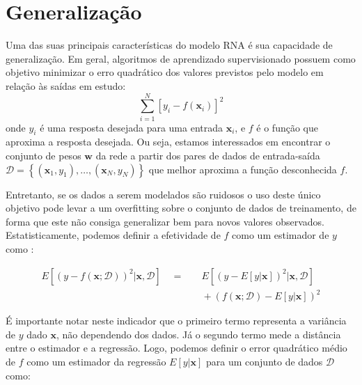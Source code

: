 \documentclass[conference]{IEEEtran}
\begin{document}
	\section{Generalização}
	 Uma das suas principais características do modelo RNA é sua capacidade de generalização.  Em geral, algoritmos de aprendizado supervisionado possuem como objetivo minimizar o erro quadrático dos valores previstos pelo modelo em relação às saídas em estudo:
	 \begin{equation}
	 	\sum_{i=1}^{N} [y_i - f(\mathbf{x}_i)]^2
	 	\label{eq:sqrd}
	 \end{equation}
	 onde $y_i$ é uma resposta desejada para uma entrada $\mathbf{x}_i$, e $f$ é o função que aproxima a resposta desejada. Ou seja, estamos interessados em encontrar o conjunto de pesos $\mathbf{w}$ da rede a partir dos pares de dados de entrada-saída $\mathcal{D} = \left\lbrace (\mathbf{x}_1, y_1), \dots, (\mathbf{x}_N, y_N)\right\rbrace $ que melhor aproxima a função desconhecida $f$.
	 
	 Entretanto, se os dados a serem modelados são ruidosos o uso deste único objetivo pode levar a um overfitting sobre o conjunto de dados de treinamento, de forma que este não consiga generalizar bem para novos valores observados. Estatisticamente, podemos definir a efetividade de $f$ como um estimador de $y$ como \cite{geman1992neural}:
	 
	 \begin{equation}
	 	\begin{aligned}
	 		E[(y - f(\mathbf{x}; \mathcal{D}))^2 | \mathbf{x}, \mathcal{D}] \quad = & \quad E\left[ (y - E \left[ y | \mathbf{x}\right] )^2 | \mathbf{x}, \mathcal{D}\right]   \\
	 		& \quad + (f(\mathbf{x};\mathcal{D}) - E[y|\mathbf{x}])^2
	 	\end{aligned}
	 \end{equation}
	 
	 É importante notar neste indicador que o primeiro termo representa a variância de $y$ dado $\mathbf{x}$, não dependendo dos dados. Já o segundo termo mede a distância entre o estimador e a regressão. Logo, podemos definir o error quadrático médio de $f$ como um estimador da regressão $E[y|\mathbf{x}]$ para um conjunto de dados $\mathcal{D}$ como:
	 
\end{document}
